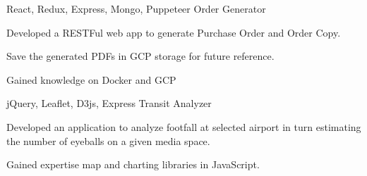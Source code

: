 

\begin{cventries}


  \cventry
  {React, Redux, Express, Mongo, Puppeteer} %
  {Order Generator} %
  {} %
  {} %
  {
    \begin{cvitems} %
      \item {Developed a RESTFul web app to generate Purchase Order and Order Copy.}
      \item {Save the generated PDFs in GCP storage for future reference.}
      \item {Gained knowledge on Docker and GCP}
    \end{cvitems}
  }


  \cventry
  {jQuery, Leaflet, D3js, Express} %
  {Transit Analyzer} %
  {} %
  {} %
  {
    \begin{cvitems} %
      \item {Developed an application to analyze footfall at selected airport in turn estimating the number of eyeballs on a given media space.}
      \item {Gained expertise map and charting libraries in JavaScript.}
    \end{cvitems}
  }

\end{cventries}
